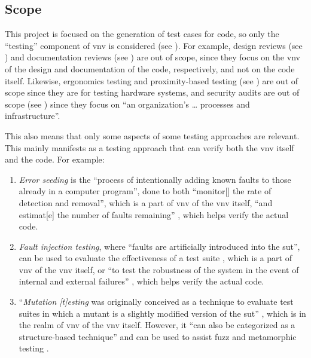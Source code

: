 \subsection{Scope}
\label{chap:notes:sec:scope}

This project is focused on the generation of test cases for code, so only
the ``testing'' component of \acf{vnv} is considered (see ).
For example, design reviews (see \citealp[p.~132]{IEEE2017}) and
documentation reviews (see \citealp[p.~144]{IEEE2017}) are out of scope,
since they focus on the \acs{vnv} of the design and documentation of the code,
respectively, and not on the code itself. Likewise, ergonomics testing
and proximity-based testing (see ) are out of scope since
they are for testing hardware systems, and security audits are out of scope
(see ) since they focus on ``an organization's … processes
and infrastructure''.

This also means that only some aspects of some testing approaches are relevant.
This mainly manifests as a testing approach that can verify both the \acs{vnv}
itself and the code. For example:

\begin{enumerate}
      \item \emph{Error seeding} is the ``process of intentionally adding
            known faults to those already in a computer program'',
            done to both ``monitor[] the rate of detection and removal'',
            which is a part of \acs{vnv} of the \acs{vnv} itself, ``and
            estimat[e] the number of faults remaining''
            \citep[p.~165]{IEEE2017}, which helps verify the actual code.
      \item \emph{Fault injection testing}, where ``faults are artificially
            introduced into the \acs{sut}'', can be used to evaluate the
            effectiveness of a test suite \citep[p.~5-18]{SWEBOK2024},
            which is a part of \acs{vnv} of the \acs{vnv} itself, or ``to test
            the robustness of the system in the event of internal and
            external failures'' \citep[p.~42]{IEEE2022}, which helps verify
            the actual code.
      \item ``\emph{Mutation [t]esting} was originally conceived as a
            technique to evaluate test suites in which a mutant is a slightly
            modified version of the \acs{sut}'' \citep[p.~5-15]{SWEBOK2024},
            which is in the realm of \acs{vnv} of the \acs{vnv} itself.
            However, it ``can also be categorized as a structure-based
            technique'' and can be used to assist fuzz and metamorphic testing
            \citep[p.~5-15]{SWEBOK2024}.
\end{enumerate}

